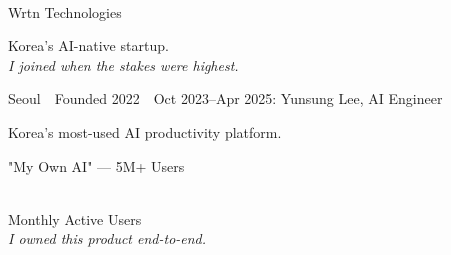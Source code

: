 
\begin{frame}[plain]
\begin{center}
\vfill
{\Huge{}}\\[1em]
{\large{}}
\vfill
\end{center}
\end{frame}

\begin{frame}{Wrtn Technologies}
\begin{center}
  {\large Korea's  AI-native startup.}\\[0.8em]
  {\normalsize\itshape I joined when the stakes were highest.}\\[1.4em]
  \begin{methodbox}[]
    \centering
    {\small Seoul\ \textperiodcentered\ Founded 2022\ \textperiodcentered\
    Oct 2023--Apr 2025: Yunsung Lee, AI Engineer}
  \end{methodbox}
  \vspace{0.8em}
  {\normalsize Korea's most-used AI productivity platform.}\\[0.3em]
  {\footnotesize{}}
\end{center}
\end{frame}

\begin{frame}{"My Own AI" — 5M+ Users}
\begin{center}
  \vspace{0.6em}
  {\fontsize{64}{72}\selectfont{}}\\[0.5em]
  {\large Monthly Active Users}\\[1.2em]
  {\normalsize\itshape I owned this product end-to-end.}\\[1em]
  {\footnotesize{}}
\end{center}
\end{frame}

